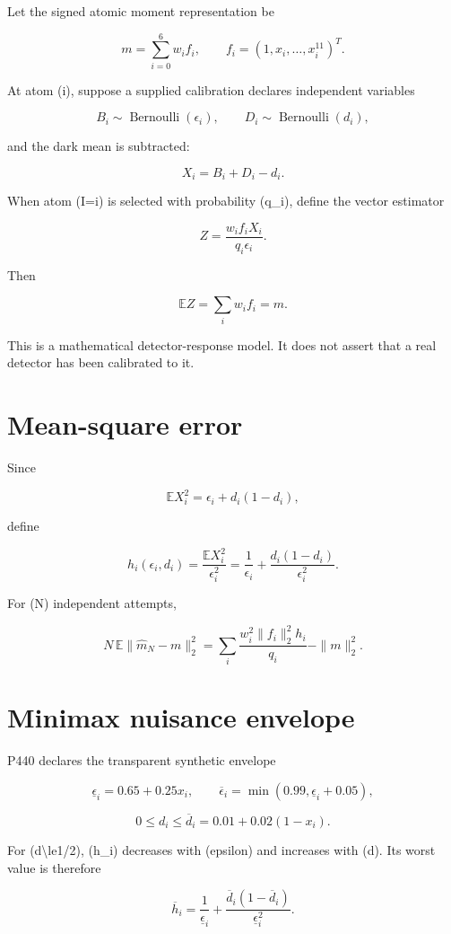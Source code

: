 \documentclass[11pt,a4paper,openany]{report}
\begin{document}
Let the signed atomic moment representation be

\[
m=\sum_{i=0}^6w_if_i,\qquad
f_i=(1,x_i,\ldots,x_i^{11})^T.
\]

At atom (i), suppose a supplied calibration declares independent variables

\[
B_i\sim\operatorname{Bernoulli}(\epsilon_i),\qquad
D_i\sim\operatorname{Bernoulli}(d_i),
\]

and the dark mean is subtracted:

\[
X_i=B_i+D_i-d_i.
\]

When atom (I=i) is selected with probability (q\_i), define the vector estimator

\[
Z=\frac{w_i f_i X_i}{q_i\epsilon_i}.
\]

Then

\[
\mathbb E Z=\sum_iw_if_i=m.
\]

This is a mathematical detector-response model. It does not assert that a real detector has been calibrated to it.

\section{Mean-square error}

Since

\[
\mathbb E X_i^2
=\epsilon_i+d_i(1-d_i),
\]

define

\[
h_i(\epsilon_i,d_i)
=\frac{\mathbb E X_i^2}{\epsilon_i^2}
=\frac1{\epsilon_i}
+\frac{d_i(1-d_i)}{\epsilon_i^2}.
\]

For (N) independent attempts,

\[
N\,\mathbb E\|\widehat m_N-m\|_2^2
=\sum_i\frac{w_i^2\|f_i\|_2^2h_i}{q_i}
-\|m\|_2^2.
\]

\section{Minimax nuisance envelope}

P440 declares the transparent synthetic envelope

\[
\underline\epsilon_i=0.65+0.25x_i,
\qquad
\overline\epsilon_i=\min(0.99,\underline\epsilon_i+0.05),
\]

\[
0\le d_i\le\overline d_i
=0.01+0.02(1-x_i).
\]

For (d\textbackslash{}le1/\allowbreak{}2), (h\_i) decreases with (epsilon) and increases with (d). Its worst value is therefore

\[
\overline h_i
=\frac1{\underline\epsilon_i}
+\frac{\overline d_i(1-\overline d_i)}{\underline\epsilon_i^2}.
\]
\end{document}

